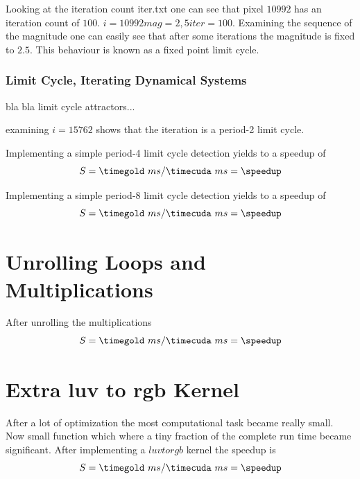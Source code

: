 Looking at the iteration count  iter.txt one can see that pixel $10992$ has an 
iteration count  of $100$. 
$ i = 10992 mag=2,5 iter=100$. Examining the sequence of the magnitude one can 
easily see that after some iterations the magnitude is fixed to $2.5$. This
behaviour is known as a fixed point limit cycle.

\subsubsection{Limit Cycle, Iterating Dynamical Systems} %
\label{ssub:limit_cycle_iterating_dynamical_systems}
bla bla  limit cycle attractors...


examining $i = 15762$ shows that the iteration is a period-2 limit cycle.

Implementing a simple period-4 limit cycle detection yields to a speedup of
\fpDiv{\speedup}{\timegold}{\timecuda}
\begin{equation*}\label{eq:speedup0}
	S = \timegold\ ms/\timecuda\ ms = \speedup
\end{equation*}

Implementing a simple period-8 limit cycle detection yields to a speedup of
\fpDiv{\speedup}{\timegold}{\timecuda}
\begin{equation*}\label{eq:speedup0}
	S = \timegold\ ms/\timecuda\ ms = \speedup
\end{equation*}


\section{Unrolling Loops and Multiplications} %
\label{sec:unrolling_loops_and_multiplications}

After unrolling the multiplications 
\fpDiv{\speedup}{\timegold}{\timecuda}
\begin{equation*}\label{eq:speedup0}
	S = \timegold\ ms/\timecuda\ ms = \speedup
\end{equation*}

\section{Extra luv to rgb Kernel}

After a lot of optimization the most computational task became really small. Now
small function which where a tiny fraction of the complete run time became 
significant. 
After implementing a $luvtorgb$ kernel the speedup is 
\fpDiv{\speedup}{\timegold}{\timecuda}
\begin{equation*}\label{eq:speedup0}
	S = \timegold\ ms/\timecuda\ ms = \speedup
\end{equation*}













